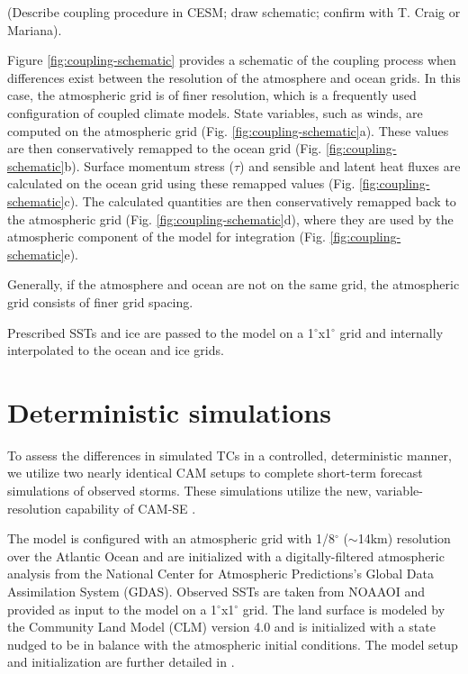 \documentclass[draft,ms]{AGUTeX}
\newcommand{\degree}{$^{\circ}$}
\newcommand{\texttilde}{$\sim$}
\begin{document}
\begin{article}
{\color{red} (Describe coupling procedure in CESM; draw schematic; confirm with T. Craig or Mariana).}

Figure \ref{fig:coupling-schematic} provides a schematic of the coupling process when differences exist between the resolution of the atmosphere and ocean grids. In this case, the atmospheric grid is of finer resolution, which is a frequently used configuration of coupled climate models. State variables, such as winds, are computed on the atmospheric grid (Fig. \ref{fig:coupling-schematic}a). These values are then conservatively remapped to the ocean grid (Fig. \ref{fig:coupling-schematic}b). Surface momentum stress ($\tau$) and sensible and latent heat fluxes are calculated on the ocean grid using these remapped values (Fig. \ref{fig:coupling-schematic}c). The calculated quantities are then conservatively remapped back to the atmospheric grid (Fig. \ref{fig:coupling-schematic}d), where they are used by the atmospheric component of the model for integration (Fig. \ref{fig:coupling-schematic}e).

Generally, if the atmosphere and ocean are not on the same grid, the atmospheric grid consists of finer grid spacing. 

Prescribed SSTs and ice are passed to the model on a 1\degree{}x1\degree{} grid and internally interpolated to the ocean and ice grids.

\section{Deterministic simulations}
\label{sec:forecast}

To assess the differences in simulated TCs in a controlled, deterministic manner, we utilize two nearly identical CAM setups to complete short-term forecast simulations of observed storms. These simulations utilize the new, variable-resolution capability of CAM-SE \citep{Zarzycki2014APE}.

The model is configured with an atmospheric grid with 1/8\degree{} (\texttilde{}14km) resolution over the Atlantic Ocean and are initialized with a digitally-filtered atmospheric analysis from the National Center for Atmospheric Predictions's Global Data Assimilation System (GDAS). Observed SSTs are taken from NOAAOI and provided as input to the model on a 1\degree{}x1\degree{} grid. The land surface is modeled by the Community Land Model (CLM) version 4.0 and is initialized with a state nudged to be in balance with the atmospheric initial conditions. The model setup and initialization are further detailed in \citet{Zarzycki2015TCForecast}.


\end{article}
\end{document}
